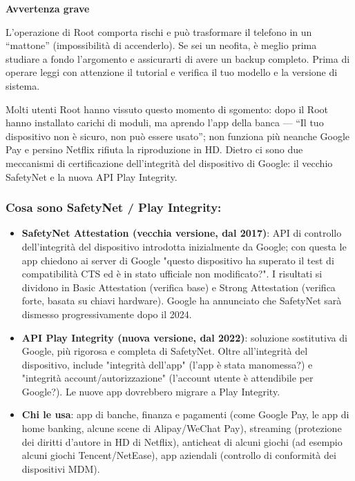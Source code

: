 \textbf{Avvertenza grave}\par

L'operazione di Root comporta rischi e può trasformare il telefono in un “mattone” (impossibilità di accenderlo). Se sei un neofita, è meglio prima studiare a fondo l'argomento e assicurarti di avere un backup completo. Prima di operare leggi con attenzione il tutorial e verifica il tuo modello e la versione di sistema.


Molti utenti Root hanno vissuto questo momento di sgomento: dopo il Root hanno installato carichi di moduli, ma aprendo l'app della banca — “Il tuo dispositivo non è sicuro, non può essere usato”; non funziona più neanche Google Pay e persino Netflix rifiuta la riproduzione in HD. Dietro ci sono due meccanismi di certificazione dell'integrità del dispositivo di Google: il vecchio SafetyNet e la nuova API Play Integrity.

\subsubsection*{Cosa sono SafetyNet / Play Integrity:}

\begin{itemize}
  \item \textbf{SafetyNet Attestation (vecchia versione, dal 2017)}: API di controllo dell'integrità del dispositivo introdotta inizialmente da Google; con questa le app chiedono ai server di Google "questo dispositivo ha superato il test di compatibilità CTS ed è in stato ufficiale non modificato?". I risultati si dividono in Basic Attestation (verifica base) e Strong Attestation (verifica forte, basata su chiavi hardware). Google ha annunciato che SafetyNet sarà dismesso progressivamente dopo il 2024.
  \item \textbf{API Play Integrity (nuova versione, dal 2022)}: soluzione sostitutiva di Google, più rigorosa e completa di SafetyNet. Oltre all'integrità del dispositivo, include "integrità dell'app" (l'app è stata manomessa?) e "integrità account/autorizzazione" (l'account utente è attendibile per Google?). Le nuove app dovrebbero migrare a Play Integrity.
  \item \textbf{Chi le usa}: app di banche, finanza e pagamenti (come Google Pay, le app di home banking, alcune scene di Alipay/WeChat Pay), streaming (protezione dei diritti d'autore in HD di Netflix), anticheat di alcuni giochi (ad esempio alcuni giochi Tencent/NetEase), app aziendali (controllo di conformità dei dispositivi MDM).
\end{itemize}

